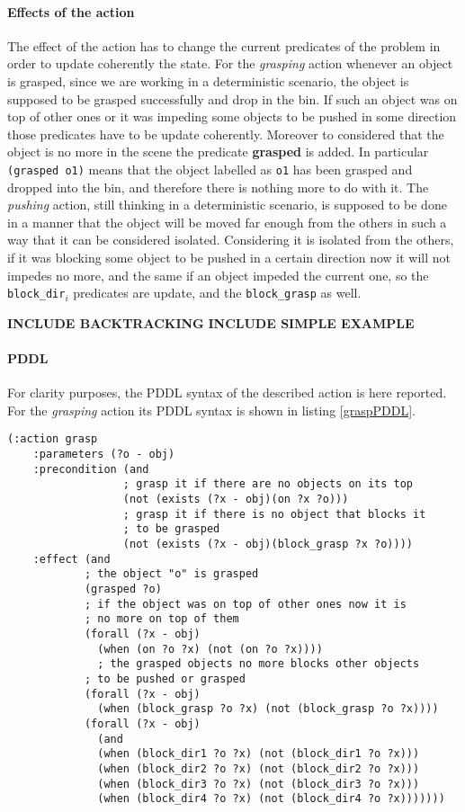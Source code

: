 \paragraph{Effects of the action}
The effect of the action has to change the current predicates of the problem in order to update coherently the state. For the \textit{grasping} action whenever an object is grasped, since we are working in a deterministic scenario, the object is supposed to be grasped successfully and drop in the bin. If such an object was on top of other ones or it was impeding some objects to be pushed in some direction those predicates have to be update coherently. Moreover to considered that the object is no more in the scene the predicate \textbf{grasped} is added. In particular \texttt{(grasped o1)} means that the object labelled as \texttt{o1} has been grasped and dropped into the bin, and therefore there is nothing more to do with it. The \textit{pushing} action, still thinking in a deterministic scenario, is supposed to be done in a manner that the object will be moved far enough from the others in such a way that it can be considered isolated. Considering it is isolated from the others, if it was blocking some object to be pushed in a certain direction now it will not impedes no more, and the same if an object impeded the current one, so the \texttt{block\_dir}$_i$ predicates are update, and the \texttt{block\_grasp} as well.  

\textbf{INCLUDE BACKTRACKING}
\textbf{INCLUDE SIMPLE EXAMPLE}

\paragraph{PDDL}
For clarity purposes, the PDDL syntax of the described action is here reported. 
For the \textit{grasping} action its PDDL syntax is shown in listing \ref{graspPDDL}.

\lstset{language=pddl}
\begin{lstlisting}[caption={PDDL syntax of the grasping action},label=graspPDDL]
(:action grasp
    :parameters (?o - obj)
    :precondition (and
                  ; grasp it if there are no objects on its top
                  (not (exists (?x - obj)(on ?x ?o)))
                  ; grasp it if there is no object that blocks it
                  ; to be grasped
                  (not (exists (?x - obj)(block_grasp ?x ?o))))
    :effect (and
            ; the object "o" is grasped
            (grasped ?o)
            ; if the object was on top of other ones now it is
            ; no more on top of them
            (forall (?x - obj)
              (when (on ?o ?x) (not (on ?o ?x))))
              ; the grasped objects no more blocks other objects 
            ; to be pushed or grasped
            (forall (?x - obj)
              (when (block_grasp ?o ?x) (not (block_grasp ?o ?x))))
            (forall (?x - obj)
              (and
              (when (block_dir1 ?o ?x) (not (block_dir1 ?o ?x)))
              (when (block_dir2 ?o ?x) (not (block_dir2 ?o ?x)))
              (when (block_dir3 ?o ?x) (not (block_dir3 ?o ?x)))
              (when (block_dir4 ?o ?x) (not (block_dir4 ?o ?x)))))))
\end{lstlisting}

